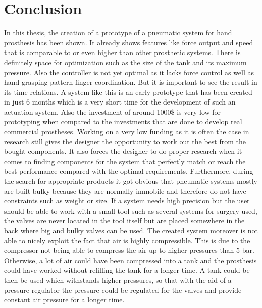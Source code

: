 \documentclass[main]{subfiles}
\begin{document}
\chapter{Conclusion} %

\label{Chapter6} %



In this thesis, the creation of a prototype of a pneumatic system for hand prosthesis has been shown. It already shows features like force output and speed that is comparable to or even higher than other prosthetic systems. There is definitely space for optimization such as the size of the tank and its maximum pressure. Also the controller is not yet optimal as it lacks force control as well as hand grasping pattern finger coordination. But it is important to see the result in its time relations. A system like this is an early prototype that has been created in just 6 months which is a very short time for the development of such an actuation system. Also the investment of around 1000\$ is very low for prototyping when compared to the investments that are done to develop real commercial prostheses. Working on a very low funding as it is often the case in research still gives the designer the opportunity to work out the best from the bought components. It also forces the designer to do proper research when it comes to finding components for the system that perfectly match or reach the best performance compared with the optimal requirements. Furthermore, during the search for appropriate products it got obvious that pneumatic systems mostly are built bulky because they are normally immobile and therefore do not have constraints such as weight or size. If a system needs high precision but the user should be able to work with a small tool such as several systems for surgery used, the valves are never located in the tool itself but are placed somewhere in the back where big and bulky valves can be used. The created system moreover is not able to nicely exploit the fact that air is highly compressible. This is due to the compressor not being able to compress the air up to higher pressures than 5 bar. Otherwise, a lot of air could have been compressed into a tank and the prosthesis could have worked without refilling the tank for a longer time. A tank could be then be used which withstands higher pressures, so that with the aid of a pressure regulator the pressure could be regulated for the valves and provide constant air pressure for a longer time.\\
\end{document}

